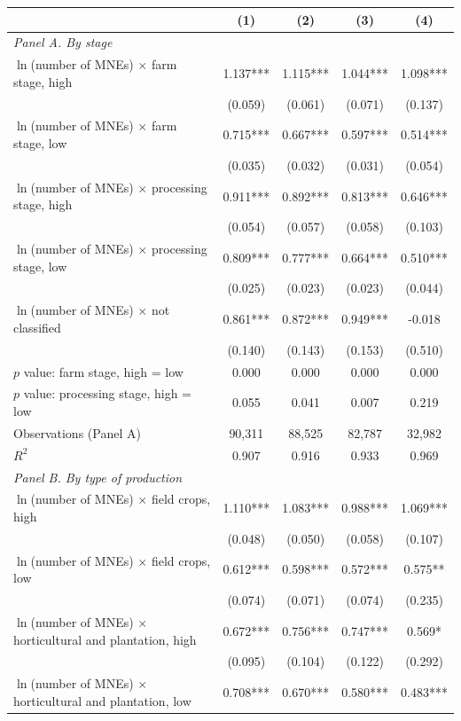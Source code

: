 \begin{tabular}{l*{4}{c}}
\toprule
 & (1) & (2) & (3) & (4) \\
\midrule
\multicolumn{5}{l}{\textit{Panel A. By stage}} \\
$\ln$(number of MNEs) $\times$ farm stage, high & 1.137*** & 1.115*** & 1.044*** & 1.098*** \\
 & (0.059) & (0.061) & (0.071) & (0.137) \\
$\ln$(number of MNEs) $\times$ farm stage, low & 0.715*** & 0.667*** & 0.597*** & 0.514*** \\
 & (0.035) & (0.032) & (0.031) & (0.054) \\
$\ln$(number of MNEs) $\times$ processing stage, high & 0.911*** & 0.892*** & 0.813*** & 0.646*** \\
 & (0.054) & (0.057) & (0.058) & (0.103) \\
$\ln$(number of MNEs) $\times$ processing stage, low & 0.809*** & 0.777*** & 0.664*** & 0.510*** \\
 & (0.025) & (0.023) & (0.023) & (0.044) \\
$\ln$(number of MNEs) $\times$ not classified & 0.861*** & 0.872*** & 0.949*** & -0.018 \\
 & (0.140) & (0.143) & (0.153) & (0.510) \\
$p$ value: farm stage, high = low & 0.000 & 0.000 & 0.000 & 0.000 \\
$p$ value: processing stage, high = low & 0.055 & 0.041 & 0.007 & 0.219 \\
Observations (Panel A) & 90,311 & 88,525 & 82,787 & 32,982 \\
$R^2$ & 0.907 & 0.916 & 0.933 & 0.969 \\
\midrule
\multicolumn{5}{l}{\textit{Panel B. By type of production}} \\
$\ln$(number of MNEs) $\times$ field crops, high & 1.110*** & 1.083*** & 0.988*** & 1.069*** \\
 & (0.048) & (0.050) & (0.058) & (0.107) \\
$\ln$(number of MNEs) $\times$ field crops, low & 0.612*** & 0.598*** & 0.572*** & 0.575** \\
 & (0.074) & (0.071) & (0.074) & (0.235) \\
$\ln$(number of MNEs) $\times$ horticultural and plantation, high & 0.672*** & 0.756*** & 0.747*** & 0.569* \\
 & (0.095) & (0.104) & (0.122) & (0.292) \\
$\ln$(number of MNEs) $\times$ horticultural and plantation, low & 0.708*** & 0.670*** & 0.580*** & 0.483*** \\

\end{tabular}
